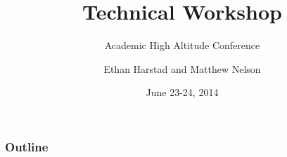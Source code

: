 \documentclass[]{beamer}
\title{Technical Workshop}
\subtitle{Academic High Altitude Conference}
\author{Ethan Harstad and Matthew Nelson}
\institute{Stratospheric Ballooning Association}
\date{June 23-24, 2014}
\begin{document}
\begin{frame}
	\titlepage
\end{frame}

\begin{frame}[t]
	\frametitle{Outline}
	\tableofcontents
\end{frame}






\end{document}
